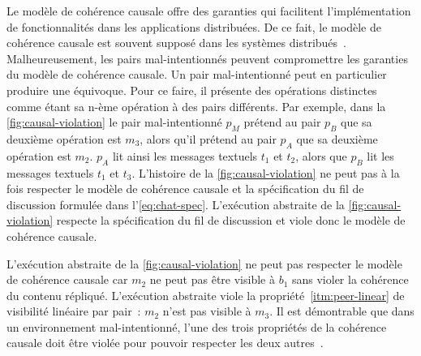 Le modèle de cohérence causale offre des garanties qui facilitent l'implémentation de fonctionnalités dans les applications distribuées.
De ce fait, le modèle de cohérence causale est souvent supposé dans les systèmes distribués~\autocite{shapiro_2011_crdt}.
Malheureusement, les pairs mal-intentionnés peuvent compromettre les garanties du modèle de cohérence causale.
Un pair mal-intentionné peut en particulier produire une équivoque.
Pour ce faire, il présente des opérations distinctes comme étant sa n-ème opération à des pairs différents.
Par exemple, dans la \autoref{fig:causal-violation} le pair mal-intentionné $p_M$ prétend au pair $p_B$ que sa deuxième opération est $m_3$, alors qu'il prétend au pair $p_A$ que sa deuxième opération est $m_2$.
$p_A$ lit ainsi les messages textuels $t_1$ et $t_2$, alors que $p_B$ lit les messages textuels $t_1$ et $t_3$.
L'histoire de la \autoref{fig:causal-violation} ne peut pas à la fois respecter le modèle de cohérence causale et la spécification du fil de discussion formulée dans l'\autoref{eq:chat-spec}.
L'exécution abstraite de la \autoref{fig:causal-violation} respecte la spécification du fil de discussion et viole donc le modèle de cohérence causale.

L'exécution abstraite de la \autoref{fig:causal-violation} ne peut pas respecter le modèle de cohérence causale car $m_2$ ne peut pas être visible à $b_1$ sans violer la cohérence du contenu répliqué.
L'exécution abstraite viole la propriété~\ref{itm:peer-linear} de visibilité linéaire par pair~: $m_2$ n'est pas visible à $m_3$.
Il est démontrable que dans un environnement mal-intentionné, l'une des trois propriétés de la cohérence causale doit être violée pour pouvoir respecter les deux autres~\autocite{mahajan_2011_cac}.

